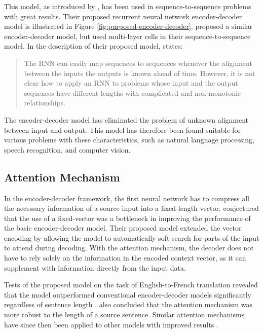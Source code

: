 This model, as introduced by \cite{cho2014learning}, has been used in sequence-to-sequence problems with great results. Their proposed recurrent neural network encoder-decoder model is illustrated in Figure \ref{fig:purposed-encoder-decoder}. \cite{sutskever2014sequence} proposed a similar encoder-decoder model, but used multi-layer cells in their sequence-to-sequence model. In the description of their proposed model, \cite{sutskever2014sequence} states:

\begin{quote}
    The RNN can easily map sequences to sequences whenever the alignment between the inputs the outputs is known ahead of time. However, it is not clear how to apply an RNN to problems whose input and the output sequences have different lengths with complicated and non-monotonic relationships.
\end{quote}

The encoder-decoder model has eliminated the problem of unknown alignment between input and output. This model has therefore been found suitable for various problems with these characteristics, such as natural language processing, speech recognition, and computer vision.

\subsection{Attention Mechanism}
\label{sec:attention_mechanism}
In the encoder-decoder framework, the first neural network has to compress all the necessary information of a source input into a fixed-length vector.  \cite{bahdanau2014neural} conjectured that the use of a fixed-vector was a bottleneck in improving the performance of the basic encoder-decoder model. Their proposed model extended the vector encoding by allowing the model to automatically soft-search for parts of the input to attend during decoding. With the attention mechanism, the decoder does not have to rely solely on the information in the encoded context vector, as it can supplement with information directly from the input data.

Tests of the proposed model on the task of English-to-French translation revealed that the model outperformed conventional encoder-decoder models significantly regardless of sentence length \citep{bahdanau2014neural}. \cite{bahdanau2014neural} also concluded that the attention mechanism was more robust to the length of a source sentence. Similar attention mechanisms have since then been applied to other models with improved results \citep{hsu2016recurrent, sankaran2016temporal}. 


